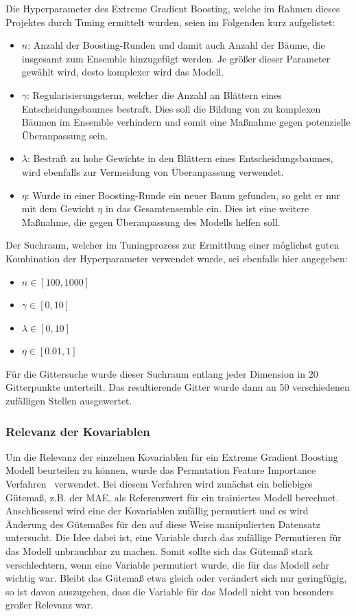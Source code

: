 Die Hyperparameter des Extreme Gradient Boosting, welche im Rahmen dieses Projektes durch Tuning
ermittelt wurden, seien im Folgenden kurz aufgelistet:
\begin{itemize}
    \item $n$: Anzahl der Boosting-Runden und damit auch Anzahl der B\"aume, die insgesamt zum Ensemble hinzugef\"ugt werden.
        Je gr\"o{\ss}er dieser Parameter gew\"ahlt wird, desto komplexer wird das Modell.
    \item $\gamma$: Regularisierungsterm, welcher die Anzahl an Bl\"attern eines Entscheidungsbaumes bestraft.
        Dies soll die Bildung von zu komplexen B\"aumen im Ensemble verhindern und somit eine Ma{\ss}nahme gegen potenzielle
        \"Uberanpassung sein.
    \item $\lambda$: Bestraft zu hohe Gewichte in den Bl\"attern eines Entscheidungsbaumes, wird ebenfalls zur Vermeidung von
        \"Uberanpassung verwendet.
    \item $\eta$: Wurde in einer Boosting-Runde ein neuer Baum gefunden, so geht er nur mit dem Gewicht $\eta$ in das 
        Gesamtensemble ein. Dies ist eine weitere Ma{\ss}nahme, die gegen \"Uberanpassung des Modells helfen soll.
\end{itemize}
Der Suchraum, welcher im Tuningprozess zur Ermittlung einer m\"oglichst guten Kombination der Hyperparameter verwendet wurde, 
sei ebenfalls hier angegeben:
\begin{itemize}
    \item $n \in \left[100, 1000 \right]$
    \item $\gamma \in \left[0, 10 \right]$
    \item $\lambda \in \left[0, 10 \right]$
    \item $\eta \in \left[0.01, 1 \right]$
\end{itemize}
F\"ur die Gittersuche wurde dieser Suchraum entlang jeder Dimension in 20 Gitterpunkte unterteilt. Das resultierende Gitter wurde
dann an 50 verschiedenen zuf\"alligen Stellen ausgewertet.

\subsubsection{Relevanz der Kovariablen}

Um die Relevanz der einzelnen Kovariablen f\"ur ein Extreme Gradient Boosting Modell beurteilen zu k\"onnen, wurde
das Permutation Feature Importance Verfahren~\cite{molnar2019} verwendet.
Bei diesem Verfahren wird zun\"achst ein beliebiges G\"utema{\ss}, z.B. der MAE, als Referenzwert f\"ur ein trainiertes Modell
berechnet. Anschliessend wird eine der Kovariablen zuf\"allig permutiert und es wird \"Anderung des G\"utema{\ss}es f\"ur den auf
diese Weise manipulierten Datensatz untersucht.
Die Idee dabei ist, eine Variable durch das zuf\"allige Permutieren f\"ur das Modell unbrauchbar zu machen.
Somit sollte sich das G\"utema{\ss} stark verschlechtern, wenn eine Variable permutiert wurde, die f\"ur das Modell sehr wichtig war.
Bleibt das G\"utema{\ss} etwa gleich oder ver\"andert sich nur geringf\"ugig, so ist davon auszugehen, dass die Variable 
f\"ur das Modell nicht von besonders gro{\ss}er Relevanz war.

